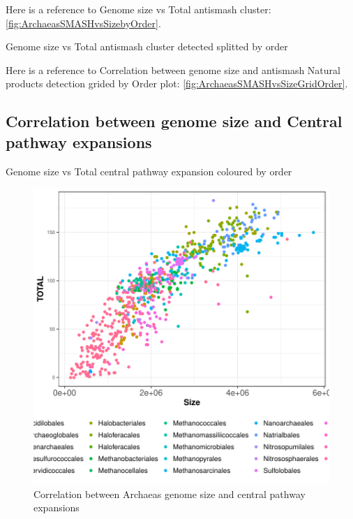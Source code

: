 \documentclass[12pt,twoside]{reedthesis}
\begin{document}
  Here is a reference to Genome size vs Total antismash cluster:
  \autoref{fig:ArchaeasSMASHvsSizebyOrder}. \clearpage
  
  Genome size vs Total antismash cluster detected splitted by order
  
  Here is a reference to Correlation between genome size and antismash
  Natural products detection grided by Order plot:
  \autoref{fig:ArchaeasSMASHvsSizeGridOrder}. \clearpage 
  
  \subsection{Correlation between genome size and Central pathway
  expansions}\label{correlation-between-genome-size-and-central-pathway-expansions}
  
  Genome size vs Total central pathway expansion coloured by order
  
  \begin{figure}[h!tbp]
  \centering
  \includegraphics[angle = 0,scale = 1]{chapter2/Archaeas/ArchaeasSizevsExpansionsbyOrder.pdf}
  \caption[Correlation between Archaeas genome size and central pathway expansions ]{\normalsize{Correlation between Archaeas genome size and central pathway expansions }}
  \label{fig:ArchaeasSizevsExpansionsbyOrder}
  \end{figure}
  
\end{document}
